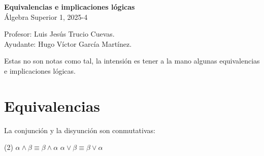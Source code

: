 \documentclass[letterpaper,DIV=12,headsepline,12pt]{scrartcl}
\begin{document}
\thispagestyle{beginstyle}
\begin{center}
  {\fontsize{30}{60}\rmfamily \textbf{Equivalencias e implicaciones lógicas}}
  \\ \vspace{.2cm}
  Álgebra Superior 1, 2025-4
\end{center}
\begin{flushright}
  \footnotesize \hfill Profesor: Luis Jesús Trucio Cuevas.\\
  \hfill Ayudante: Hugo Víctor García Martínez.
\end{flushright}

Estas no son notas como tal, la intensión es tener a la mano algunas
equivalencias e implicaciones lógicas.

\section{Equivalencias}
La conjunción y la disyunción son conmutativas:
\begin{tasks}(2)
  \task \(\alpha\land\beta\equiv\beta\land\alpha\)
  \task \(\alpha\lor\beta\equiv\beta\lor\alpha\)
\end{tasks}
\end{document}
